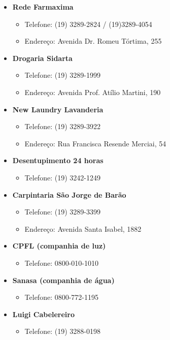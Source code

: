 \begin{itemize}
\item  \textbf{Rede Farmaxima}
\begin{itemize}
\item  Telefone: (19) 3289-2824 / (19)3289-4054
\item  Endereço: Avenida Dr. Romeu Tórtima, 255
\end{itemize}

\item  \textbf{Drogaria Sidarta}
\begin{itemize}
\item  Telefone: (19) 3289-1999
\item  Endereço: Avenida Prof. Atílio Martini, 190
\end{itemize}

\item  \textbf{New Laundry Lavanderia}
\begin{itemize}
\item  Telefone: (19) 3289-3922
\item  Endereço: Rua Francisca Resende Merciai, 54
\end{itemize}

\item  \textbf{Desentupimento 24 horas}
\begin{itemize}
\item  Telefone: (19) 3242-1249
\end{itemize}

\item  \textbf{Carpintaria São Jorge de Barão}
\begin{itemize}
\item  Telefone: (19) 3289-3399
\item  Endereço: Avenida Santa Isabel, 1882
\end{itemize}

\item  \textbf{CPFL (companhia de luz)}
\begin{itemize}
\item  Telefone: 0800-010-1010
\end{itemize}

\item  \textbf{Sanasa (companhia de água)}
\begin{itemize}
\item  Telefone: 0800-772-1195
\end{itemize}

\item  \textbf{Luigi Cabelereiro}
\begin{itemize}
\item  Telefone: (19) 3288-0198
\end{itemize}


\end{itemize}
